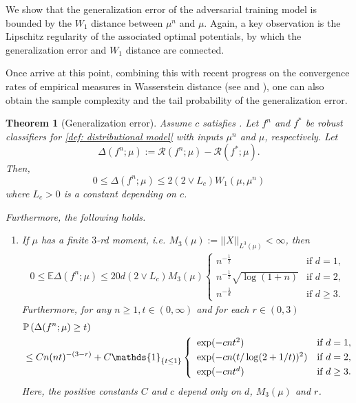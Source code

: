 \documentclass{amsart}
\theoremstyle{plain}
\numberwithin{equation}{section}\newtheorem{theorem}{Theorem}[section]
\theoremstyle{remark}
\begin{document}
We show that the generalization error of the adversarial training model is bounded by the $W_1$ distance between $\mu^n$ and $\mu$. Again, a key observation is the Lipschitz regularity of the associated optimal potentials, by which the generalization error and $W_1$ distance are connected. 


Once arrive at this point, combining this with recent progress on the convergence rates of empirical measures in Wasserstein distance (see  and ), one can also obtain the sample complexity and the tail probability of the generalization error.



\begin{theorem}[Generalization error]\label{thm: generalization error}
Assume $c$ satisfies . Let $f^n$ and $f^*$ be robust classifiers for \eqref{def: distributional model} with inputs $\mu^n$ and $\mu$, respectively. Let
\[
    \Delta(f^n;\mu):=\mathscr{R}(f^n; \mu) - \mathscr{R}(f^*; \mu).
\]
Then, 
\[
   0 \leq \Delta(f^n;\mu) \leq 2 (2 \vee L_c) W_1(\mu, \mu^n)
\]
where $L_c > 0$ is a constant depending on $c$.




Furthermore, the following holds.
\begin{enumerate}
    \item[(i)] If $\mu$ has a finite $3$-rd moment, i.e. $M_3(\mu):=||X||_{L^3(\mu)} < \infty$, then
\begin{equation*}
    \begin{aligned}
    0 \leq \mathbb{E}\Delta(f^n;\mu) \leq 20 d (2 \vee L_c) M_3(\mu)  
    \left\{ 
    \begin{array}{ll}
    n^{-\frac{1}{2}} & \textrm{if $d=1$,}\\
    n^{-\frac{1}{2}}\sqrt{\log (1 + n)} & \textrm{if $d=2$,}\\
    n^{-\frac{1}{d}} & \textrm{if $d \geq 3$.}
    \end{array} 
    \right.
    \end{aligned}
\end{equation*}
Furthermore, for any $n \geq 1, t \in (0,\infty)$ and for each $r \in (0, 3)$
\begin{align*}
    &\mathbb{P}\left( \Delta(f^n;\mu) \geq t \right)\\
    &\leq C
    n (nt)^{-(3 -r)} + C \mathds{1}_{\{t\leq 1\}}
    \left\{\begin{array}{ll}
    \exp(-cnt^2) & \hbox{if $d=1$}, \\[+3pt]
    \exp(-cn(t/\log(2+1/t))^2) & \hbox{if $d=2$}, \\[+3pt]
    \exp(-cn t^{d}) & \hbox{if $d \geq 3$}.
\end{array}\right.
\end{align*}
Here, the positive constants $C$ and $c$ depend only on $d$, $M_3(\mu)$ and $r$.


\end{enumerate}
\end{theorem}
\end{document}
